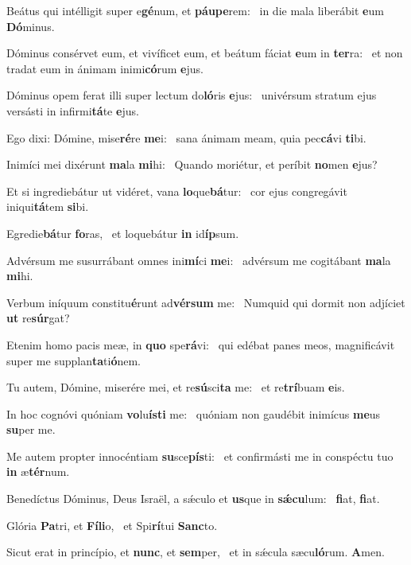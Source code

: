 \item Beátus qui intélligit super e\textbf{gé}num, et \textbf{páu}\textbf{pe}rem:~\psstar{} in die mala liberábit \textbf{e}um \textbf{Dó}minus.
\item Dóminus consérvet eum, et vivíficet eum, et beátum fáciat \textbf{e}um in \textbf{ter}ra:~\psstar{} et non tradat eum in ánimam inimi\textbf{có}rum \textbf{e}jus.
\item Dóminus opem ferat illi super lectum do\textbf{ló}ris \textbf{e}jus:~\psstar{} univérsum stratum ejus versásti in infirmi\textbf{tá}te \textbf{e}jus.
\item Ego dixi: Dómine, mise\textbf{ré}re \textbf{me}i:~\psstar{} sana ánimam meam, quia pec\textbf{cá}vi \textbf{ti}bi.
\item Inimíci mei dixérunt \textbf{ma}la \textbf{mi}hi:~\psstar{} Quando moriétur, et períbit \textbf{no}men \textbf{e}jus?
\item Et si ingrediebátur ut vidéret, vana \textbf{lo}que\textbf{bá}tur:~\psstar{} cor ejus congregávit iniqui\textbf{tá}tem \textbf{si}bi.
\item Egredie\textbf{bá}tur \textbf{fo}ras,~\psstar{} et loquebátur \textbf{in} id\textbf{íp}sum.
\item Advérsum me susurrábant omnes ini\textbf{mí}ci \textbf{me}i:~\psstar{} advérsum me cogitábant \textbf{ma}la \textbf{mi}hi.
\item Verbum iníquum constitu\textbf{é}runt ad\textbf{vér}\textbf{sum} me:~\psstar{} Numquid qui dormit non adjíciet \textbf{ut} re\textbf{súr}gat?
\item Etenim homo pacis meæ, in \textbf{quo} spe\textbf{rá}vi:~\psstar{} qui edébat panes meos, magnificávit super me supplan\textbf{ta}ti\textbf{ó}nem.
\item Tu autem, Dómine, miserére mei, et re\textbf{sú}sci\textbf{ta} me:~\psstar{} et re\textbf{trí}buam \textbf{e}is.
\item In hoc cognóvi quóniam \textbf{vo}lu\textbf{ís}\textbf{ti} me:~\psstar{} quóniam non gaudébit inimícus \textbf{me}us \textbf{su}per me.
\item Me autem propter innocéntiam \textbf{su}sce\textbf{pís}ti:~\psstar{} et confirmásti me in conspéctu tuo \textbf{in} æ\textbf{tér}num.
\item Benedíctus Dóminus, Deus Israël, a sǽculo et \textbf{us}que in \textbf{sǽ}\textbf{cu}lum:~\psstar{} \textbf{fi}at, \textbf{fi}at.
\item Glória \textbf{Pa}tri, et \textbf{Fí}\textbf{li}o,~\psstar{} et Spi\textbf{rí}tui \textbf{Sanc}to.
\item Sicut erat in princípio, et \textbf{nunc}, et \textbf{sem}per,~\psstar{} et in sǽcula sæcu\textbf{ló}rum. \textbf{A}men.